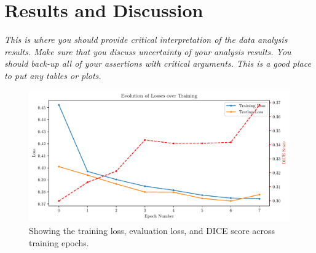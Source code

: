 \section{Results and Discussion}
\textit{This is where you should provide critical interpretation of the data analysis results. Make sure that you discuss uncertainty of your analysis results. You should back-up all of your assertions with critical arguments. This is a 
good place to put any tables or plots.}

\begin{figure}[htbp]
    \centering
    \includegraphics[width=\linewidth]{figs/training_progression.pdf}
    \caption{Showing the training loss, evaluation loss, and DICE score across training epochs.}
    \label{fig:loss}
\end{figure}